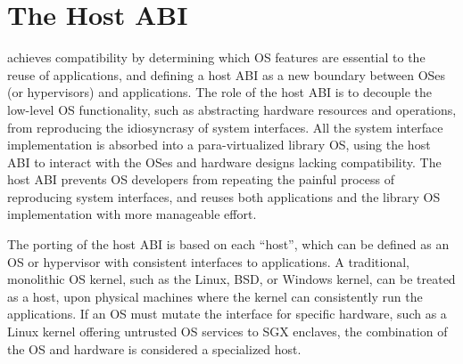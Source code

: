 \section{The Host ABI}
\label{sec:overview:host}


\graphene{} achieves compatibility by determining which OS features
are essential to the reuse of applications, and defining a host ABI as a new boundary between OSes (or hypervisors) and applications.
The role of the host ABI is to decouple the low-level OS functionality, such as abstracting hardware resources and operations, from reproducing the idiosyncrasy of system interfaces. 
All the system interface implementation is absorbed
into a para-virtualized library OS,
using the host ABI to interact with the OSes and hardware designs
lacking compatibility.
The host ABI prevents OS developers
from repeating the painful process of reproducing system interfaces,
and reuses both applications and the library OS implementation with more manageable effort.


 






The porting of the host ABI is based on each ``host'', which can be defined as an OS or hypervisor with consistent interfaces to applications.
A traditional, monolithic OS kernel, such as the Linux, BSD, or Windows kernel, can be treated as a host, upon physical machines where the kernel can consistently run the applications.
If an OS must mutate the interface for specific hardware,
such as a Linux kernel offering untrusted OS services to SGX enclaves,
the combination of the OS and hardware is considered a specialized host.

